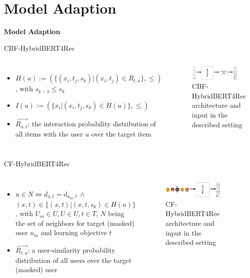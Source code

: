 \documentclass[en]{sdqbeamer}
\begin{document}
\section{Model Adaption}
\begin{frame}
	\centering\textbf{\LARGE{Model Adaption}}
\end{frame}

\begin{frame}{CBF-HybridBERT4Rec}
	\begin{columns}
			\begin{itemize}
				\item $H(u) := (\{(x_i, t_j, s_k)| (x_i, t_j) \in R_{t,x}\}, \leq)$, with $s_{k-1} \leq s_k$
				\item $I(u) := (\{x_i|(x_i, t_j, s_k) \in H(u)\}, \leq)$
				\item $\overrightarrow{R_{u,t}}$: the interaction probability distribution of all items with the user $u$ over the target item
			\end{itemize}
		\begin{figure}
			\includegraphics[width=\textwidth]{images/cbf.pdf}
			\caption{CBF-HybridBERT4Rec architecture and input in the described setting}
		\end{figure}
	\end{columns}
\end{frame}


\begin{frame}{CF-HybridBERT4Rec}
	\begin{columns}
		\column{0.5\textwidth}
			\begin{itemize}
				\item $u \in N \iff d_{u, t} = d_{u_m, t} \, \wedge$ $(x, t) \in \{(x,t)|(x,t,s_k) \in H(u)\}$, with $U_m \in U, U \in U, t \in T$, $N$ being the set of neighbors for target (masked) user $u_{m}$ and learning objective $t$
				\item $\overrightarrow{R_{t,u}}$: a user-similarity probability distribution of all users over the target (masked) user
			\end{itemize}
		\column{0.5\textwidth}
		\begin{figure}
			\includegraphics[width=\textwidth]{images/CF_use_case.pdf}
			\caption{CF-HybridBERT4Rec architecture and input in the described setting}
		\end{figure}
	\end{columns}
\end{frame}
\end{document}
